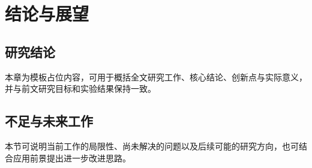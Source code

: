 \section{结论与展望}\label{chap:conclusion}

\subsection{研究结论}

本章为模板占位内容，可用于概括全文研究工作、核心结论、创新点与实际意义，并与前文研究目标和实验结果保持一致。

\subsection{不足与未来工作}

本节可说明当前工作的局限性、尚未解决的问题以及后续可能的研究方向，也可结合应用前景提出进一步改进思路。
